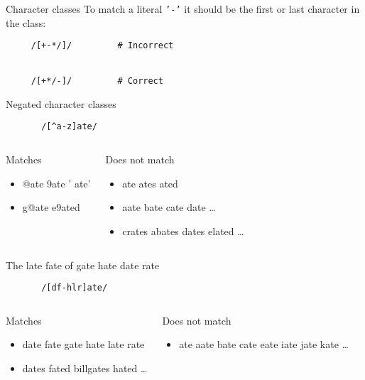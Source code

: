 \documentclass{beamer}
\begin{document}
\begin{frame}[fragile]{Character classes}
  To match a literal \texttt{'-'} it should be the first or last character in the class:
  \begin{verbatim}
     /[+-*/]/         # Incorrect


     /[+*/-]/         # Correct
  \end{verbatim}
\end{frame}

\begin{frame}[fragile]{Negated character classes}
  \begin{verbatim}
       /[^a-z]ate/
  \end{verbatim}
  \begin{columns}[t]
      \begin{block}{Matches}
        \begin{itemize}
        \item @ate 9ate ' ate'
        \item g@ate e9ated
        \end{itemize}
      \end{block}
      \begin{block}{Does not match}
        \begin{itemize}
        \item ate ates ated
        \item aate bate cate date \ldots
        \item crates abates dates elated \ldots
        \end{itemize}
      \end{block}
  \end{columns}
\end{frame}

\begin{frame}[fragile]{The late fate of gate hate date rate}
  \begin{verbatim}
       /[df-hlr]ate/
  \end{verbatim}
  \begin{columns}[t]
      \begin{block}{Matches}
        \begin{itemize}
        \item date fate gate hate late rate
        \item<2-> dates fated billgates hated \ldots
        \end{itemize}
      \end{block}
      \begin{block}{Does not match}
        \begin{itemize}
        \item ate aate bate cate eate iate jate kate \ldots
        \end{itemize}
      \end{block}
  \end{columns}
\end{frame}
\end{document}
